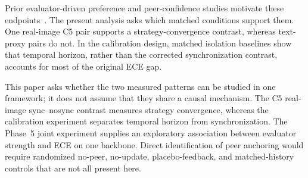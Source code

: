 \documentclass[11pt]{article}
\begin{document}
Prior evaluator-driven preference and peer-confidence studies motivate these endpoints~\cite{impossible2026,mmepc2026,calibration2026}. The present analysis asks which matched conditions support them. One real-image C5 pair supports a strategy-convergence contrast, whereas text-proxy pairs do not. In the calibration design, matched isolation baselines show that temporal horizon, rather than the corrected synchronization contrast, accounts for most of the original ECE gap.

This paper asks whether the two measured patterns can be studied in one framework; it does not assume that they share a causal mechanism. The C5 real-image sync--nosync contrast measures strategy convergence, whereas the calibration experiment separates temporal horizon from synchronization. The Phase~5 joint experiment supplies an exploratory association between evaluator strength and ECE on one backbone. Direct identification of peer anchoring would require randomized no-peer, no-update, placebo-feedback, and matched-history controls that are not all present here.
\end{document}
